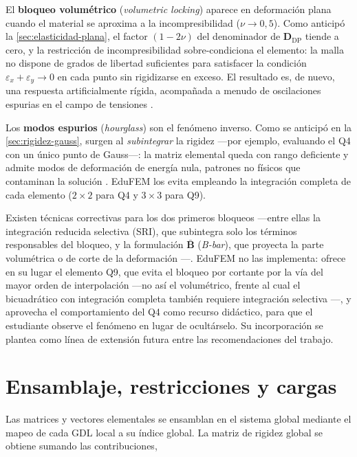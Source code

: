 El \textbf{bloqueo volumétrico} (\emph{volumetric locking}) aparece en deformación plana cuando el material se aproxima a la incompresibilidad ($\nu \to 0{,}5$). Como anticipó la \autoref{sec:elasticidad-plana}, el factor $(1-2\nu)$ del denominador de $\bm{D}_{\text{DP}}$ tiende a cero, y la restricción de incompresibilidad sobre-condiciona el elemento: la malla no dispone de grados de libertad suficientes para satisfacer la condición $\varepsilon_x + \varepsilon_y \to 0$ en cada punto sin rigidizarse en exceso. El resultado es, de nuevo, una respuesta artificialmente rígida, acompañada a menudo de oscilaciones espurias en el campo de tensiones \autocite{hughes2000fem,bathe2014fem}.

Los \textbf{modos espurios} (\emph{hourglass}) son el fenómeno inverso. Como se anticipó en la \autoref{sec:rigidez-gauss}, surgen al \emph{subintegrar} la rigidez —por ejemplo, evaluando el Q4 con un único punto de Gauss—: la matriz elemental queda con rango deficiente y admite modos de deformación de energía nula, patrones no físicos que contaminan la solución \autocite{cook2002concepts,bathe2014fem}. EduFEM los evita empleando la integración completa de cada elemento ($2\times2$ para Q4 y $3\times3$ para Q9).

Existen técnicas correctivas para los dos primeros bloqueos —entre ellas la integración reducida selectiva (SRI), que subintegra solo los términos responsables del bloqueo, y la formulación $\bar{\bm{B}}$ (\emph{B-bar}), que proyecta la parte volumétrica o de corte de la deformación \autocite{hughes2000fem,bathe2014fem}—. EduFEM no las implementa: ofrece en su lugar el elemento Q9, que evita el bloqueo por cortante por la vía del mayor orden de interpolación —no así el volumétrico, frente al cual el bicuadrático con integración completa también requiere integración selectiva \autocite[p.~222]{hughes2000fem}—, y aprovecha el comportamiento del Q4 como recurso didáctico, para que el estudiante observe el fenómeno en lugar de ocultárselo. Su incorporación se plantea como línea de extensión futura entre las recomendaciones del trabajo.

\section{Ensamblaje, restricciones y cargas}
\label{sec:ensamblaje}

Las matrices y vectores elementales se ensamblan en el sistema global mediante el mapeo de cada GDL local a su índice global. La matriz de rigidez global se obtiene sumando las contribuciones,

